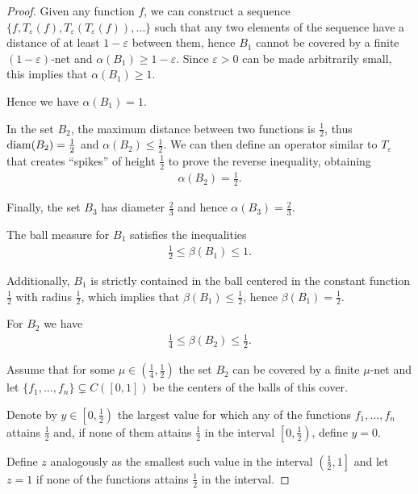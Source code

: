 \begin{proof}
  Given any function $f$, we can construct a sequence $\{ f, T_\varepsilon(f), T_\varepsilon(T_\varepsilon(f)), \ldots \}$ such that any two elements of the sequence have a distance of at least $1 - \varepsilon$ between them, hence $B_1$ cannot be covered by a finite $(1-\varepsilon)$-net and $\alpha(B_1) \geq 1 - \varepsilon$. Since $\varepsilon > 0$ can be made arbitrarily small, this implies that $\alpha(B_1) \geq 1$.

  Hence we have $\alpha(B_1) = 1$.

  In the set $B_2$, the maximum distance between two functions is $\frac 1 2$, thus $\operatorname{diam}(B_2) = \frac 1 2$ and $\alpha(B_2) \leq \frac 1 2$. We can then define an operator similar to $T_\varepsilon$ that creates \enquote{spikes} of height $\frac 1 2$ to prove the reverse inequality, obtaining
  \begin{align*}
    \alpha(B_2) = \frac 1 2.
  \end{align*}

  Finally, the set $B_3$ has diameter $\frac 2 3$ and hence $\alpha(B_3) = \frac 2 3$.

  The ball measure for $B_1$ satisfies the inequalities
  \begin{align*}
    \frac 1 2 \leq \beta(B_1) \leq 1.
  \end{align*}

  Additionally, $B_1$ is strictly contained in the ball centered in the constant function $\frac 1 2$ with radius $\frac 1 2$, which implies that $\beta(B_1) \leq \frac 1 2$, hence $\beta(B_1) = \frac 1 2$.

  For $B_2$ we have
  \begin{align*}
    \frac 1 4 \leq \beta(B_2) \leq \frac 1 2.
  \end{align*}

  Assume that for some $\mu \in \left(\frac 1 4, \frac 1 2 \right)$ the set $B_2$ can be covered by a finite $\mu$-net and let $\{ f_1, \ldots, f_n \} \subsetneq C([0, 1])$ be the centers of the balls of this cover.

  Denote by $y \in \left[0, \frac 1 2 \right)$ the largest value for which any of the functions $f_1, \ldots, f_n$ attains $\frac 1 2$ and, if none of them attains $\frac 1 2$ in the interval $\left[0, \frac 1 2 \right)$, define $y = 0$.

  Define $z$ analogously as the smallest such value in the interval $\left(\frac 1 2, 1 \right]$ and let $z = 1$ if none of the functions attains $\frac 1 2$ in the interval.


\end{proof}
